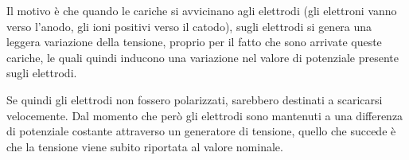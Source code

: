 \vspace{-0.1cm}

\begin{minipage}{0.395\textwidth}
   \begin{figure}[H]
      \centering
   \end{figure}
\end{minipage}
\begin{minipage}{0.6\textwidth}
   \vspace{0.5cm}Il motivo è che quando le cariche si avvicinano agli elettrodi (gli elettroni vanno verso l'anodo, gli ioni positivi verso il catodo), sugli elettrodi si genera una leggera variazione della tensione, proprio per il fatto che sono arrivate queste cariche, le quali quindi inducono una variazione nel valore di potenziale presente sugli elettrodi.
\end{minipage}

\vspace{0.1cm}

Se quindi gli elettrodi non fossero polarizzati, sarebbero destinati a scaricarsi velocemente. Dal momento che però gli elettrodi sono mantenuti a una differenza di potenziale costante attraverso un generatore di tensione, quello che succede è che la tensione viene subito riportata al valore nominale.

